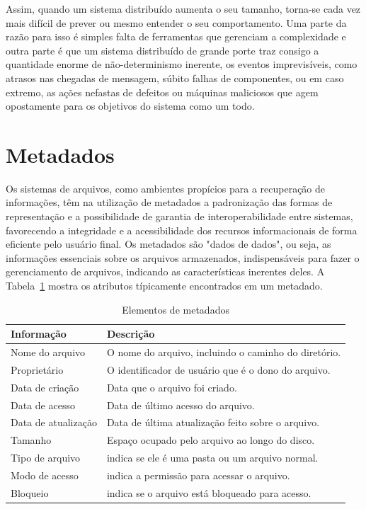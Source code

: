 	Assim, quando um sistema distribuído aumenta o seu tamanho, torna-se cada vez mais difícil de prever ou mesmo entender o seu comportamento. Uma parte da razão para isso é simples falta de ferramentas que gerenciam a complexidade e outra parte é que um sistema distribuído de grande porte traz consigo a quantidade enorme de não-determinismo inerente, os eventos imprevisíveis, como atrasos nas chegadas de mensagem, súbito falhas de componentes, ou em caso extremo, as ações nefastas de defeitos ou máquinas maliciosos que agem opostamente para os objetivos do sistema como um todo.
	
		\section{Metadados} 
		
		Os sistemas de arquivos, como ambientes propícios para a recuperação de informações, têm na utilização de metadados a padronização das formas de representação e a possibilidade de garantia de interoperabilidade entre sistemas, favorecendo a integridade e a acessibilidade dos recursos informacionais de forma eficiente pelo usuário final. Os metadados são "dados de dados", ou seja, as informações essenciais sobre os arquivos armazenados, indispensáveis para fazer o gerenciamento de arquivos, indicando as características inerentes deles. A Tabela~\ref{tab:metadado} mostra os atributos típicamente encontrados em um metadado.
		
		\capstartfalse
		\begin{table} [htb]
			\caption{Elementos de metadados}
			\centering
			\begin{tabular}{|l|l|} \hline
				\textbf{Informação} & \textbf{Descrição} \\ \hline
				
				Nome do arquivo		& O nome do arquivo, incluindo o caminho do diretório.\\ \hline
				Proprietário		& O identificador de usuário que é o dono do arquivo.\\ \hline
				Data de criação     & Data que o arquivo foi criado.\\ \hline
				Data de acesso		& Data de último acesso do arquivo. \\ \hline
				Data de atualização	& Data de última atualização feito sobre o arquivo. \\ \hline
				Tamanho				& Espaço ocupado pelo arquivo ao longo do disco. \\ \hline
				Tipo de arquivo		& indica se ele é uma pasta ou um arquivo normal.  \\ \hline
				Modo de acesso		& indica a permissão para acessar o arquivo. \\ \hline
				Bloqueio			& indica se o arquivo está bloqueado para acesso. \\ \hline
				
			\end{tabular}
			\label{tab:metadado}
		\end{table}
		\capstarttrue
	

